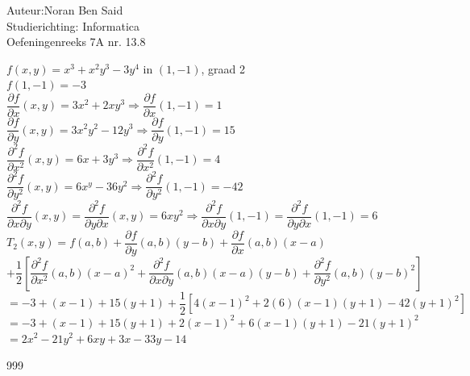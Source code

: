 \documentclass[a4paper]{article}
\begin{document}
  
\noindent \large Auteur:Noran Ben Said \\
\noindent \large Studierichting: Informatica\\
\noindent \large Oefeningenreeks 7A nr. 13.8\\

\medskip

\normalsize

$f(x,y) = x^3 + x^2y^3-3y^4$ in $\left(1,-1\right)$, graad 2\\

$f(1,-1) = -3$\\

$\dfrac{\partial f}{\partial x}\left(x,y\right) = 3x^2+2xy^3 \Rightarrow \dfrac{\partial f}{\partial x}\left(1,-1\right) = 1$\\

$\dfrac{\partial f}{\partial y}\left(x,y\right) = 3x^2y^2-12y^3 \Rightarrow \dfrac{\partial f}{\partial y}\left(1,-1\right) = 15$\\

$\dfrac{\partial^2 f}{\partial x^2}\left(x,y\right) = 6x+3y^3 \Rightarrow \dfrac{\partial^2 f}{\partial x^2}\left(1,-1\right) = 4$\\

$\dfrac{\partial^2 f}{\partial y^2}\left(x,y\right) = 6x^y-36y^2 \Rightarrow \dfrac{\partial^2 f}{\partial y^2}\left(1,-1\right) = -42$\\

$\dfrac{\partial^2 f}{\partial x \partial y}\left(x,y\right) = \dfrac{\partial^2 f}{\partial y \partial x}\left(x,y\right) = 6xy^2 \Rightarrow \dfrac{\partial^2 f}{\partial x \partial y}\left(1,-1\right) = \dfrac{\partial^2 f}{\partial y \partial x}\left(1,-1\right) = 6$\\

$T_2(x,y) = f(a,b) + \dfrac{\partial f}{\partial y}(a,b)(y-b) + \dfrac{\partial f}{\partial x}(a,b)(x-a)$\\

$+ \dfrac{1}{2}\left[\dfrac{\partial^2 f}{\partial x^2}(a,b)(x-a)^2 + \dfrac{\partial^2 f}{\partial x \partial y}(a,b)(x-a)(y-b) + \dfrac{\partial^2 f}{\partial y^2}(a,b)(y-b)^2\right]$\\

$ = -3 + (x-1) + 15(y+1) + \dfrac{1}{2}\left[4(x-1)^2+2(6)(x-1)(y+1)-42(y+1)^2\right]$\\

$ = -3 + (x-1) + 15(y+1) + 2(x-1)^2+6(x-1)(y+1)-21(y+1)^2$\\

$ = 2x^2 - 21y^2 + 6xy + 3x - 33y - 14$\\

\begin{thebibliography}{999}
\end{thebibliography}
\end{document}
